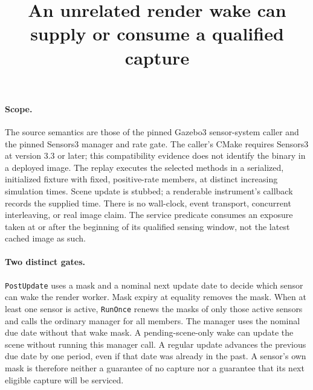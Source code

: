\documentclass{article}
\begin{document}
\title{An unrelated render wake can supply or consume a qualified capture}
\maketitle

\paragraph{Scope.}
The source semantics are those of the pinned Gazebo3 sensor-system caller
and the pinned Sensors3 manager and rate gate. The caller's CMake requires
Sensors3 at version 3.3 or later; this compatibility evidence does not
identify the binary in a deployed image. The replay executes the selected
methods in a serialized, initialized fixture with fixed, positive-rate
members, at distinct increasing simulation times. Scene update is stubbed;
a renderable instrument's callback records the supplied time. There is no
wall-clock, event transport, concurrent interleaving, or real image claim.
The service predicate consumes an exposure taken at or after the beginning
of its qualified sensing window, not the latest cached image as such.

\paragraph{Two distinct gates.}
\texttt{PostUpdate} uses a mask and a nominal next update date to decide
which sensor can wake the render worker. Mask expiry at equality removes
the mask. When at least one sensor is active, \texttt{RunOnce} renews the
masks of only those active sensors and calls the ordinary manager for all
members. The manager uses the nominal due date without that wake mask.
A pending-scene-only wake can update the scene without running this
manager call. A regular update advances the previous due date by one
period, even if that date was already in the past. A sensor's own mask
is therefore neither a guarantee of no capture nor a guarantee that its
next eligible capture will be serviced.
\end{document}
